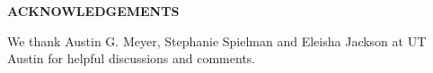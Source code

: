 \documentclass[11pt]{article}
\def\Acknowledgements{\bigskip  \bigskip \begin{center} \begin{large}
             \bf ACKNOWLEDGEMENTS \end{large}\end{center}}
\begin{document}
\begin{appendices}
%

\end{appendices}

\Acknowledgements

We thank Austin G. Meyer, Stephanie Spielman and Eleisha Jackson at UT Austin for helpful discussions and comments.




\newpage
\end{document}
